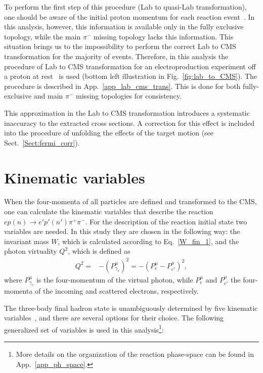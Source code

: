To perform the first step of this procedure (Lab to quasi-Lab transformation), one should be aware of the initial proton momentum for each reaction event~\cite{twopeg-d}. In this analysis, however, this information is available only in the fully exclusive topology, while the main $\pi^{-}$ missing topology lacks this information. This situation brings us to the impossibility to perform the correct Lab to CMS transformation for the majority of events. Therefore, in this analysis the procedure of Lab to CMS transformation for an electroproduction experiment off a proton at rest~\cite{Fed_an_note:2017} is used (bottom left illustration in Fig.~\ref{fig:lab_to_CMS}). The procedure is described in App.~\ref{app_lab_cms_trans}. This is done for both fully-exclusive and main $\pi^{-}$ missing topologies for consistency.

This approximation in the Lab to CMS transformation introduces a systematic inaccuracy to the extracted cross sections. A correction for this effect is included into the procedure of unfolding the effects of the target motion (see Sect.~\ref{Sect:fermi_corr}).




\clearpage


\section{Kinematic variables}
\label{Sect:kin_var}


When the four-momenta of all particles are defined and transformed to the CMS, one can calculate the kinematic variables that describe the reaction $ep(n) \rightarrow e'p'(n')\pi^{+}\pi^{-}$. For the description of the reaction initial state two variables are needed. In this study they are chosen in the following way: the invariant mass $W$, which is calculated according to Eq.~\eqref{W_fin_1}, and the photon virtuality $Q^{2}$, which is defined as
\begin{eqnarray}
Q^{2}= & -(P_{\gamma_{v}}^{\mu})^{2} = -(P_{e}^{\mu}-P_{e'}^{\mu})^{2}, \label{eq:q2} 
\end{eqnarray}
where $P_{\gamma_{v}}^{\mu}$ is the four-momentum of the virtual photon, while $P_{e}^{\mu}$ and $P_{e'}^{\mu}$ the four-momenta of the incoming and scattered electrons, respectively. 


The three-body final hadron state is unambiguously determined by five kinematic variables~\cite{Fed_an_note:2017}, and there are several options for their choice. The following generalized set of variables is used in this analysis\footnote[5]{More details on the organization of the reaction phase-space can be found in App.~\ref{app_ph_space}.}:\vspace{-0.5em}

